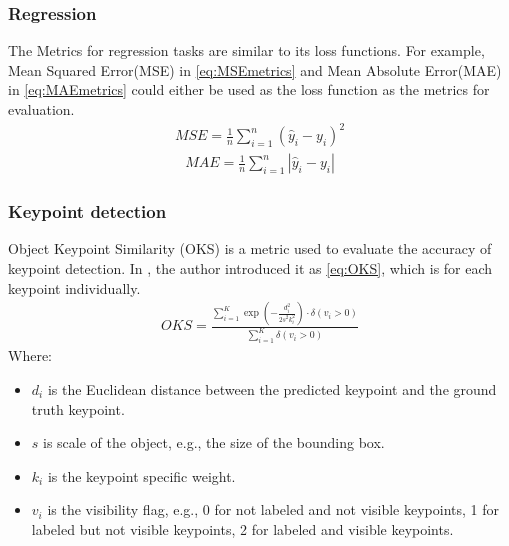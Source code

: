 \subsubsection{Regression}
The Metrics for regression tasks are similar to its loss functions. For example, Mean Squared Error(MSE) in \autoref{eq:MSEmetrics} and Mean Absolute Error(MAE)
in \autoref{eq:MAEmetrics} could either be used as the loss function as the metrics for evaluation. 
\begin{equation}
  \begin{aligned}
    MSE = \frac{1}{n} \sum_{i=1}^n (\hat{y}_i - y_i)^2
      \label{eq:MSEmetrics}
  \end{aligned}
\end{equation}
\begin{equation}
  \begin{aligned}
    MAE = \frac{1}{n} \sum_{i=1}^n |\hat{y}_i - y_i|
      \label{eq:MAEmetrics}
  \end{aligned}
\end{equation}
\subsubsection{Keypoint detection}
Object Keypoint Similarity (OKS) is a metric used to evaluate the accuracy of keypoint detection. In \cite{Maji_2022_CVPR}, the author introduced it as \autoref{eq:OKS},
which is for each keypoint individually.
\begin{equation}
  \begin{aligned}
    OKS = \frac{\sum_{i=1}^{K} \exp \left( -\frac{d_i^2}{2s^2k_i^2} \right) \cdot \delta(v_i > 0)}{\sum_{i=1}^{K} \delta(v_i > 0)}
      \label{eq:OKS}
  \end{aligned}
\end{equation}
Where:
\begin{itemize}
    \item \( d_i \) is the Euclidean distance between the predicted keypoint and the ground truth keypoint.
    \item \( s \) is scale of the object, e.g., the size of the bounding box.
    \item \( k_i \) is the keypoint specific weight.
    \item \( v_i \) is the visibility flag, e.g., 0 for not labeled and not visible keypoints, 1 for labeled but not visible keypoints, 2 for labeled and visible keypoints.
\end{itemize}

